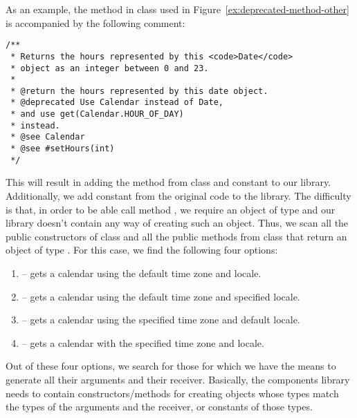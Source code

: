 \documentclass[runningheads,a4paper]{llncs}
\begin{document}
As an example, the  method in class  used in Figure~\ref{ex:deprecated-method-other} is accompanied by the following comment:

\begin{lstlisting}[mathescape=true,showstringspaces=false]
/**
 * Returns the hours represented by this <code>Date</code>
 * object as an integer between 0 and 23.
 *
 * @return the hours represented by this date object.
 * @deprecated Use Calendar instead of Date,
 * and use get(Calendar.HOUR_OF_DAY)
 * instead.
 * @see Calendar
 * @see #setHours(int)
 */  
\end{lstlisting}



This will result in adding the method  from class
 and constant  to our library.
Additionally, we add constant  from the original code to the library.
The difficulty is that, in order to be able call method , we require an object of
type  and our library doesn't contain any way of creating such an object.
Thus, we scan all the public constructors of class 
and all the public methods from class  that return an object of type . For this case, we find the following four options:

\begin{enumerate}
  \item {} -- gets a calendar using the default time zone and locale.
  \item {} -- gets a calendar using the default time zone and specified locale.
  \item {} -- gets a calendar using the specified time zone and default locale.
  \item {} -- gets a calendar with the specified time zone and locale.
\end{enumerate}

Out of these four options, we search for those for which we have the means to generate all their arguments and their receiver.
Basically, the components library needs to contain constructors/methods for creating objects whose types
match the types of the arguments and the receiver, or constants of those types.
\end{document}
